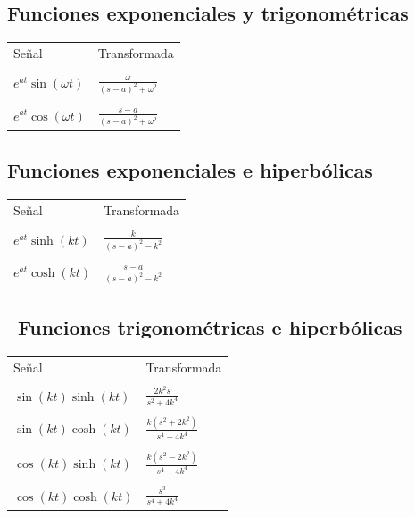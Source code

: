 \subsection{Funciones exponenciales y trigonom\'{e}tricas}

\begin{center}
\begin{tabular}{ll}
Se\~{n}al                               &       Transformada                            \\
& \\
$e^{at}\sin \left( \omega t\right) $ & $\frac{\omega }{\left( s-a\right)^{2}+\omega ^{2}}$ \\ 
& \\
$e^{at}\cos \left( \omega t\right)  $ & $\frac{s-a}{\left( s-a\right)^{2}+\omega ^{2}}$
\end{tabular}
\end{center}

\subsection{Funciones exponenciales e hiperb\'{o}licas}

\begin{center}
\begin{tabular}{ll}
Se\~{n}al                               &       Transformada                            \\
& \\
$e^{at}\sinh \left( kt\right) $ & $\frac{k}{\left( s-a\right) ^{2}-k^{2}}$ \\ 
& \\
$e^{at}\cosh \left( kt\right)  $ & $\frac{s-a}{\left( s-a\right)^{2}-k^{2}}$
\end{tabular}

\end{center}

\subsection{\ Funciones trigonom\'{e}tricas e hiperb\'{o}licas}

\begin{center}
\begin{tabular}{ll}
Se\~{n}al                               &       Transformada                            \\
& \\
$\sin \left( kt\right) \sinh \left( kt\right) $ & $\frac{2k^{2}s}{s^{2}+4k^{4}}$ \\ 
& \\
$\sin \left( kt\right) \cosh \left( kt\right) $ & $\frac{k\left(s^{2}+2k^{2}\right) }{s^{4}+4k^{4}}$ \\ 
& \\
$\cos \left( kt\right) \sinh \left( kt\right) $ & $\frac{k\left(s^{2}-2k^{2}\right) }{s^{4}+4k^{4}}$ \\ 
& \\
$\cos \left( kt\right) \cosh \left( kt\right)  $ & $\frac{s^{3}}{s^{4}+4k^{4}}$
\end{tabular}
\end{center}

